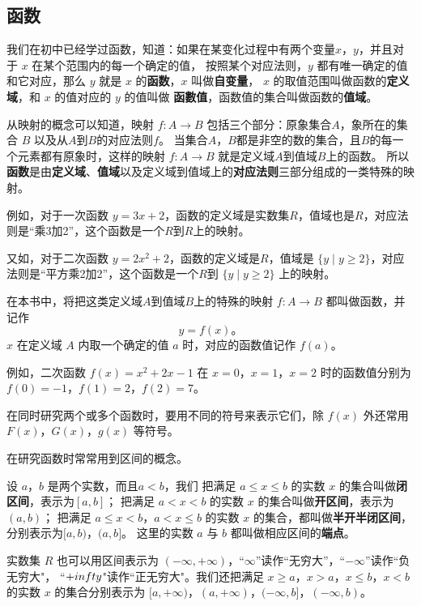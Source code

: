 \subsection{函数}

我们在初中已经学过函数，知道：如果在某变化过程中有两个变量$x$，$y$，并且对于 $x$ 在某个范围内的每一个确定的值，
按照某个对应法则，$y$ 都有唯一确定的值和它对应，那么 $y$ 就是 $x$ 的\textbf{函数}，$x$ 叫做\textbf{自变量}，
$x$ 的取值范围叫做函数的\textbf{定义域}，和 $x$ 的值对应的 $y$ 的值叫做 \textbf{函數值}，函数值的集合叫做函数的\textbf{值域}。

从映射的概念可以知道，映射 $f: A \to B$ 包括三个部分：原象集合$A$，象所在的集合 $B$ 以及从$A$到$B$的对应法则$f$。
当集合$A$，$B$都是非空的数的集合，且$B$的每一个元素都有原象时，这样的映射 $f: A \to B$ 就是定义域$A$到值域$B$上的函数。
所以\textbf{函数}是由\textbf{定义域}、\textbf{值域}以及定义域到值域上的\textbf{对应法则}三部分组成的一类特殊的映射。

例如，对于一次函数 $y=3x+2$，函数的定义域是实数集$R$，值域也是$R$，对应法则是“乘3加2”，这个函数是一个$R$到$R$上的映射。

又如，对于二次函数 $y=2x^2+2$，函数的定义域是$R$，值域是 $\{y \mid y \geqslant 2\}$，对应法则是“平方乘2加2”，这个函数是一个$R$到 $\{y \mid y \geqslant 2\}$ 上的映射。

在本书中，将把这类定义域$A$到值域$B$上的特殊的映射 $f : A \to B$ 都叫做函数，并记作
$$y = f(x) \text{。}$$
$x$ 在定义域 $A$ 内取一个确定的值 $a$ 时，对应的函数值记作 $f(a)$。

例如，二次函数 $f(x)=x^2+2x-1$ 在 $x=0$，$x=1$，$x=2$ 时的函数值分别为 $f(0)=-1$，$f(1)=2$，$f(2)=7$。

在同时研究两个或多个函数时，要用不同的符号来表示它们，除 $f(x)$ 外还常用 $F(x)$，$G(x)$，$g(x)$ 等符号。

在研究函数时常常用到区间的概念。

设 $a$，$b$ 是两个实数，而且$a<b$，我们
把满足 $a \leqslant x \leqslant b$ 的实数 $x$ 的集合叫做\textbf{闭区间}，表示为$[a,b]$；
把满足 $a < x < b$ 的实数 $x$ 的集合叫做\textbf{开区间}，表示为 $(a, b)$；
把满足 $a \leqslant x < b$，$a < x \leqslant b$ 的实数 $x$ 的集合，都叫做\textbf{半开半闭区间}，分别表示为$[a,b)$，$(a,b]$。
这里的实数 $a$ 与 $b$ 都叫做相应区间的\textbf{端点}。

实数集 $R$ 也可以用区间表示为 $(-\infty, +\infty)$，“$\infty$”读作“无穷大”，“$-\infty$”读作“负无穷大"，
“$+\\infty$"读作“正无穷大"。我们还把满足 $x \geqslant a$，$x > a$，$x \leqslant b$，$x < b$ 的实数 $x$
的集合分别表示为 $[a, +\infty)$，$(a, +\infty)$，$(-\infty, b]$，$(-\infty, b)$。

